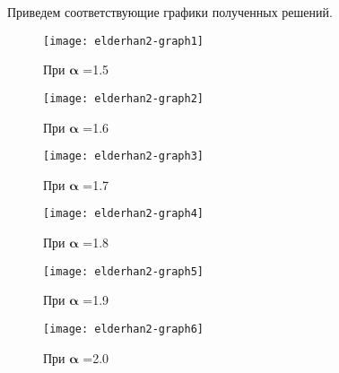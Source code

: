 Приведем  соответствующие графики полученных решений.

\begin{minipage}{\linewidth}
    \centering
    \begin{minipage}{0.45\linewidth}
        \begin{figure}[H]
            \texttt{[image: elderhan2-graph1]}
            \caption{При ${\mathbf \alpha }$ =1.5}
        \end{figure}
    \end{minipage}
    \hspace{0.05\linewidth}
    \begin{minipage}{0.45\linewidth}
        \begin{figure}[H]
            \texttt{[image: elderhan2-graph2]}
            \caption{При ${\mathbf \alpha }$ =1.6}
        \end{figure}
    \end{minipage}
\end{minipage}

\begin{minipage}{\linewidth}
    \centering
    \begin{minipage}{0.45\linewidth}
        \begin{figure}[H]
            \texttt{[image: elderhan2-graph3]}
            \caption{При ${\mathbf \alpha }$ =1.7}
        \end{figure}
    \end{minipage}
    \hspace{0.05\linewidth}
    \begin{minipage}{0.45\linewidth}
        \begin{figure}[H]
            \texttt{[image: elderhan2-graph4]}
            \caption{При ${\mathbf \alpha }$ =1.8}
        \end{figure}
    \end{minipage}
\end{minipage}

\begin{minipage}{\linewidth}
    \centering
    \begin{minipage}{0.45\linewidth}
        \begin{figure}[H]
            \texttt{[image: elderhan2-graph5]}
            \caption{При ${\mathbf \alpha }$ =1.9}
        \end{figure}
    \end{minipage}
    \hspace{0.05\linewidth}
    \begin{minipage}{0.45\linewidth}
        \begin{figure}[H]
            \texttt{[image: elderhan2-graph6]}
            \caption{При ${\mathbf \alpha }$ =2.0}
        \end{figure}
    \end{minipage}
\end{minipage}

